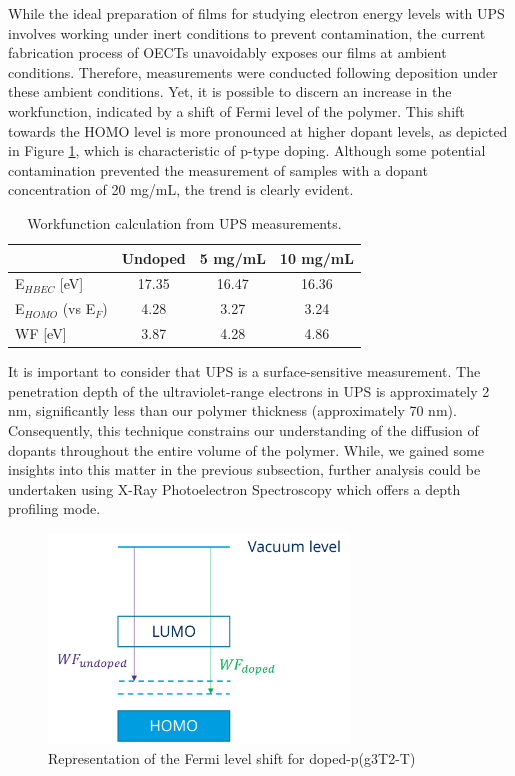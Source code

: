 While the ideal preparation of films for studying electron energy levels with UPS involves working under inert conditions to prevent contamination, the current fabrication process of OECTs unavoidably exposes our films at ambient conditions. Therefore, measurements were conducted following deposition under these ambient conditions. Yet, it is possible to discern an increase in the workfunction, indicated by a shift of Fermi level of the polymer. This shift towards the HOMO level is more pronounced at higher dopant levels, as depicted in Figure \ref{fig:ups}, which is characteristic of p-type doping. Although some potential contamination prevented the measurement of samples with a dopant concentration of 20 mg/mL, the trend is clearly evident.

\begin{table}[ht]
\centering
\caption{Workfunction calculation from UPS measurements.}
\begin{tabular}{l|c|c|c}
& Undoped & 5 mg/mL & 10 mg/mL \\\hline
E$_{HBEC}$ [eV] & 17.35 & 16.47 & 16.36\\
E$_{HOMO}$ (vs E$_{F}$) & 4.28 & 3.27 & 3.24\\
WF [eV] & 3.87 & 4.28 & 4.86\\\hline
\end{tabular}
\label{tab:ups}
\end{table}

It is important to consider that UPS is a surface-sensitive measurement. The penetration depth of the ultraviolet-range electrons in UPS is approximately 2 nm, significantly less than our polymer thickness (approximately 70 nm). Consequently, this technique constrains our understanding of the diffusion of dopants throughout the entire volume of the polymer. While, we gained some insights into this matter in the previous subsection, further analysis could be undertaken using X-Ray Photoelectron Spectroscopy which offers a depth profiling mode. %

\begin{figure}[ht]
  \centering
  \includegraphics[width=8cm]{Images/pdf/WF.pdf}
  \caption[Representation of the Fermi level shift upon doping]{Representation of the Fermi level shift for doped-p(g3T2-T)}
  \label{fig:ups}
\end{figure}

